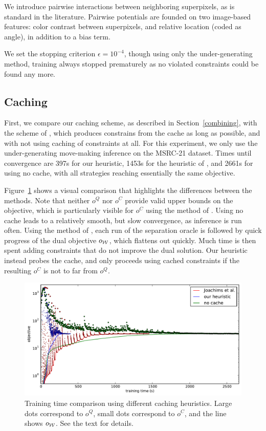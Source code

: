 We introduce pairwise interactions between neighboring superpixels, as is
standard in the literature. Pairwise potentials are founded on two
image-based features: color contrast between superpixels, and relative location
(coded as angle), in addition to a bias term.

We set the stopping criterion $\epsilon=10^{-4}$, though using only
the under-generating method, training always stopped prematurely as no violated
constraints could be found any more.

\subsection{Caching}
First, we compare our caching scheme, as described in Section~\ref{combining}, with the
scheme of \citet{joachims2009cutting}, which produces constrains from the cache
as long as possible, and with not using caching of constraints at all.  For this experiment,
we only use the under-generating move-making inference on the MSRC-21 dataset. Times until convergence
are 397s for our heuristic, 1453s for the heuristic of
\citet{joachims2009cutting}, and 2661s for using no cache, with all strategies
reaching essentially the same objective.

Figure~\ref{caching} shows a visual comparison that highlights the differences
between the methods. Note that neither $o^Q$ nor $o^C$ provide valid upper bounds on the objective,
which is particularly visible for $o^C$ using the method of \cite{joachims2009cutting}.
Using no cache leads to a relatively smooth, but slow convergence, as inference is run often.
Using the method of \citet{joachims2009cutting}, each run of the separation oracle is followed by
quick progress of the dual objective $o_{\mathcal{W}}$, which flattens out quickly. Much time is then spent adding
constraints that do not improve the dual solution.
Our heuristic instead probes the cache, and only proceeds using cached constraints if the resulting
$o^C$ is not to far from $o^Q$.

\begin{figure}
\centering
\includegraphics[width=.7\linewidth]{caching}
\caption{%
Training time comparison using different caching heuristics.
Large dots correspond to $o^Q$, small dots correspond to $o^C$,
and the line shows $o_{\mathcal{W}}$. See the text for details.\label{caching}}
\end{figure}



